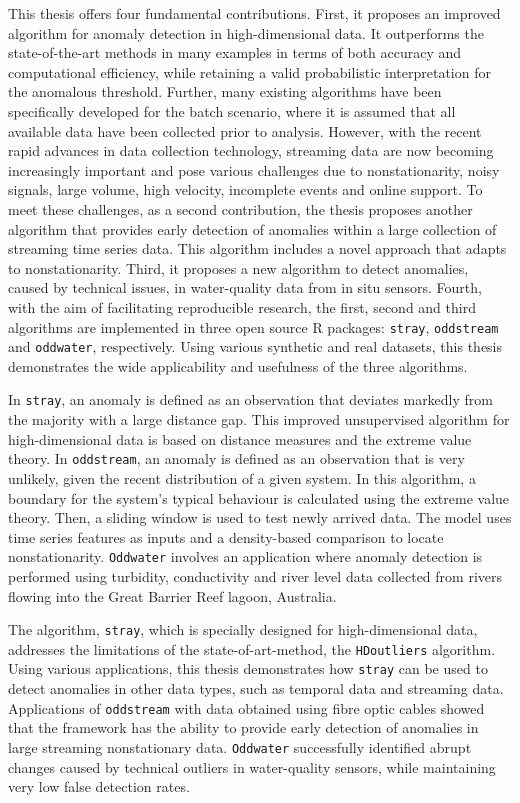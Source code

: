 \documentclass{monashthesis}
\theoremstyle{definition}
\theoremstyle{definition}
\theoremstyle{definition}
\theoremstyle{remark}
\begin{document}
This thesis offers four fundamental contributions. First, it proposes an improved algorithm for anomaly detection in high-dimensional data. It outperforms the state-of-the-art methods in many examples in terms of both accuracy and computational efficiency, while retaining a valid probabilistic interpretation for the anomalous threshold. Further, many existing algorithms have been specifically developed for the batch scenario, where it is assumed that all available data have been collected prior to analysis. However, with the recent rapid advances in data collection technology, streaming data are now becoming increasingly important and pose various challenges due to nonstationarity, noisy signals, large volume, high velocity, incomplete events and online support. To meet these challenges, as a second contribution, the thesis proposes another algorithm that provides early detection of anomalies within a large collection of streaming time series data. This algorithm includes a novel approach that adapts to nonstationarity. Third, it proposes a new algorithm to detect anomalies, caused by technical issues, in water-quality data from in situ sensors. Fourth, with the aim of facilitating reproducible research, the first, second and third algorithms are implemented in three open source R packages: \texttt{stray}, \texttt{oddstream} and \texttt{oddwater}, respectively. Using various synthetic and real datasets, this thesis demonstrates the wide applicability and usefulness of the three algorithms.

In \texttt{stray}, an anomaly is defined as an observation that deviates markedly from the majority with a large distance gap. This improved unsupervised algorithm for high-dimensional data is based on distance measures and the extreme value theory. In \texttt{oddstream}, an anomaly is defined as an observation that is very unlikely, given the recent distribution of a given system. In this algorithm, a boundary for the system's typical behaviour is calculated using the extreme value theory. Then, a sliding window is used to test newly arrived data. The model uses time series features as inputs and a density-based comparison to locate nonstationarity. \texttt{Oddwater} involves an application where anomaly detection is performed using turbidity, conductivity and river level data collected from rivers flowing into the Great Barrier Reef lagoon, Australia.

The algorithm, \texttt{stray}, which is specially designed for high-dimensional data, addresses the limitations of the state-of-art-method, the \texttt{HDoutliers} algorithm. Using various applications, this thesis demonstrates how \texttt{stray} can be used to detect anomalies in other data types, such as temporal data and streaming data. Applications of \texttt{oddstream} with data obtained using fibre optic cables showed that the framework has the ability to provide early detection of anomalies in large streaming nonstationary data. \texttt{Oddwater} successfully identified abrupt changes caused by technical outliers in water-quality sensors, while maintaining very low false detection rates.
\end{document}
